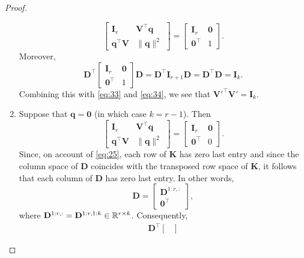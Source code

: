 \documentclass[11pt,a4paper]{article}
\theoremstyle{break}
\numberwithin{dummy}{section}
\theoremstyle{plain}
\theoremstyle{plain}
\theoremstyle{plain}
\theoremstyle{plain}
\theoremstyle{plain}
\theoremstyle{MyNonumberplain}
\newtheorem{proof}{Proof}
\newcommand{\0}{\M{0}}
\newcommand{\M}[1]{\mathbf{#1}}
\newcommand{\R}{\mathbb{R}}
\newcommand{\T}{\top}
\newcommand{\ve}[1]{\mathbf{#1}}
\newcommand{\Mat}[2]{%
  \ifthenelse{\equal{#2}{1}}
  {\R^{#1}}
  {\R^{#1 \times #2}}
}
\begin{document}
\begin{proof}
\begin{enumerate}[font=\upshape,label=(\roman*),wide,align=right]
\begin{equation}
\begin{bmatrix}
        \M{I}_r & \M{V}^\T \ve{q}
        \\
        \ve{q}^\T \M{V} & \| \ve{q} \|^2
      \end{bmatrix}
      =
      \begin{bmatrix}
        \M{I}_r & \0 \\
        \0^\T& 1
      \end{bmatrix}.
    \end{equation}
    Moreover,
    \begin{displaymath}
      \M{D}^\T
      \begin{bmatrix}
        \M{I}_r & \0 \\
        \0^\T& 1
      \end{bmatrix}
      \M{D}
      =
      \M{D}^\T \M{I}_{r+1} \M{D}
      =
      \M{D}^\T \M{D}
      = \M{I}_k.
    \end{displaymath}
    Combining this with \eqref{eq:33} and \eqref{eq:34}, we see that
    \begin{math}
      \M{V}'^\T \M{V}' = \M{I}_k.
    \end{math}
  \item Suppose that $\ve{q} = \0$ (in which case $k = r-1$). Then
    \begin{equation}
      \label{eq:35}
      \begin{bmatrix}
        \M{I}_r & \M{V}^\T \ve{q} \\
        \ve{q}^\T \M{V} & \| \ve{q} \|^2
      \end{bmatrix}
      =
      \begin{bmatrix}
        \M{I}_r & \0 \\
        \0^\T & 0
      \end{bmatrix}.
    \end{equation}
    Since, on account of \eqref{eq:25}, each row of $\M{K}$ has zero last entry and since the column space of $\M{D}$ coincides with the transposed row space of $\M{K}$, it follows that each column of $\M{D}$ has zero last entry. In other words,
    \begin{equation}
      \label{eq:36}
      \M{D}
      =
      \begin{bmatrix}
        \M{D}^{1:r, :}
        \\
        \0^\T
      \end{bmatrix},
    \end{equation}
    where $\M{D}^{1:r, :} = \M{D}^{1:r,1:k} \in \Mat{r}{k}$.  Consequently,
    \begin{align*}
      \M{D}^\T
      \begin{bmatrix}

\end{bmatrix}
\end{align*}
\end{enumerate}
\end{proof}
\end{document}
